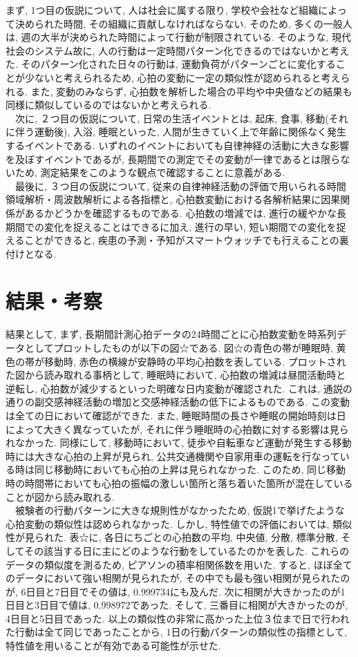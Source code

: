 \documentclass[report, 11pt, a4paper]{jsbook}
\begin{document}
まず, 1つ目の仮説について, 人は社会に属する限り, 学校や会社など組織によって決められた時間, その組織に貢献しなければならない. そのため, 多くの一般人は, 週の大半が決められた時間によって行動が制限されている. そのような, 現代社会のシステム故に, 人の行動は一定時間パターン化できるのではないかと考えた. そのパターン化された日々の行動は, 運動負荷がパターンごとに変化することが少ないと考えられるため, 心拍の変動に一定の類似性が認められると考えられる. また, 変動のみならず, 心拍数を解析した場合の平均や中央値などの結果も同様に類似しているのではないかと考えられる. \\
　次に, ２つ目の仮説について, 日常の生活イベントとは, 起床, 食事, 移動(それに伴う運動後), 入浴, 睡眠といった, 人間が生きていく上で年齢に関係なく発生するイベントである. いずれのイベントにおいても自律神経の活動に大きな影響を及ぼすイベントであるが, 長期間での測定でその変動が一律であるとは限らないため, 測定結果をこのような観点で確認することに意義がある. \\
　最後に, ３つ目の仮説について, 従来の自律神経活動の評価で用いられる時間領域解析・周波数解析による各指標と, 心拍数変動における各解析結果に因果関係があるかどうかを確認するものである. 心拍数の増減では, 進行の緩やかな長期間での変化を捉えることはできるに加え, 進行の早い, 短い期間での変化を捉えることができると, 疾患の予測・予知がスマートウォッチでも行えることの裏付けとなる. 
　
\section{結果・考察}
結果として, まず, 長期間計測心拍データの24時間ごとに心拍数変動を時系列データとしてプロットしたものが以下の図☆である. 図☆の青色の帯が睡眠時, 黄色の帯が移動時, 赤色の横線が安静時の平均心拍数を表している. プロットされた図から読み取れる事柄として, 睡眠時において, 心拍数の増減は昼間活動時と逆転し, 心拍数が減少するといった明確な日内変動が確認された. これは, 通説の通りの副交感神経活動の増加と交感神経活動の低下によるものである. この変動は全ての日において確認ができた. また, 睡眠時間の長さや睡眠の開始時刻は日によって大きく異なっていたが, それに伴う睡眠時の心拍数に対する影響は見られなかった. 同様にして, 移動時において, 徒歩や自転車など運動が発生する移動時には大きな心拍の上昇が見られ, 公共交通機関や自家用車の運転を行なっている時は同じ移動時においても心拍の上昇は見られなかった. このため, 同じ移動時の時間帯においても心拍の振幅の激しい箇所と落ち着いた箇所が混在していることが図から読み取れる. \\
　被験者の行動パターンに大きな規則性がなかったため, 仮説1で挙げたような心拍変動の類似性は認められなかった. しかし, 特性値での評価においては, 類似性が見られた. 表☆に, 各日にちごとの心拍数の平均, 中央値, 分散, 標準分散, そしてその該当する日に主にどのような行動をしているたのかを表した. これらのデータの類似度を測るため, ピアソンの積率相関係数を用いた. すると, ほぼ全てのデータにおいて強い相関が見られたが, その中でも最も強い相関が見られたのが, 6日目と7日目でその値は, 0.999734にも及んだ. 次に相関が大きかったのが1日目と3日目で値は, 0.998972であった. そして, 三番目に相関が大きかったのが, 4日目と5日目であった. 以上の類似性の非常に高かった上位３位まで日で行われた行動は全て同じであったことから, 1日の行動パターンの類似性の指標として, 特性値を用いることが有効である可能性が示せた.  
 
\end{document}
